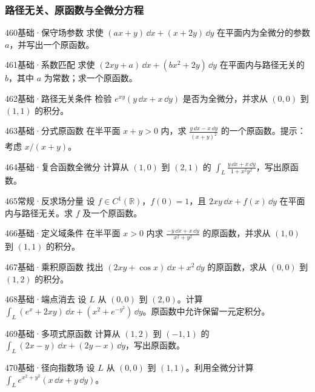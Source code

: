 \subsubsection{路径无关、原函数与全微分方程}
\begin{exercise}{460}{基础·保守场参数}
求使 $(ax+y)\,\dd x+(x+2y)\,\dd y$ 在平面内为全微分的参数 $a$，并写出一个原函数。
\end{exercise}
\begin{exercise}{461}{基础·系数匹配}
求使 $(2xy+a)\,\dd x+(bx^2+2y)\,\dd y$ 在平面内与路径无关的 $b$，其中 $a$ 为常数；求一个原函数。
\end{exercise}
\begin{exercise}{462}{基础·路径无关条件}
检验 $e^{xy}(y\,\dd x+x\,\dd y)$ 是否为全微分，并求从 $(0,0)$ 到 $(1,1)$ 的积分。
\end{exercise}
\begin{exercise}{463}{基础·分式原函数}
在半平面 $x+y>0$ 内，求 $\frac{y\,\dd x-x\,\dd y}{(x+y)^2}$ 的一个原函数。提示：考虑 $x/(x+y)$。
\end{exercise}
\begin{exercise}{464}{基础·复合函数全微分}
计算从 $(1,0)$ 到 $(2,1)$ 的 $\int_L\frac{y\,\dd x+x\,\dd y}{1+x^2y^2}$，写出原函数。
\end{exercise}
\begin{exercise}{465}{常规·反求场分量}
设 $f\in C^1(\mathbb R)$，$f(0)=1$，且 $2xy\,\dd x+f(x)\,\dd y$ 在平面内与路径无关。求 $f$ 及一个原函数。
\end{exercise}
\begin{exercise}{466}{基础·定义域条件}
在半平面 $x>0$ 内求 $\frac{-y\,\dd x+x\,\dd y}{x^2+y^2}$ 的原函数，并求从 $(1,0)$ 到 $(1,1)$ 的积分。
\end{exercise}
\begin{exercise}{467}{基础·乘积原函数}
找出 $(2xy+\cos x)\,\dd x+x^2\,\dd y$ 的原函数，求从 $(0,0)$ 到 $(1,2)$ 的积分。
\end{exercise}
\begin{exercise}{468}{基础·端点消去}
设 $L$ 从 $(0,0)$ 到 $(2,0)$。计算 $\int_L(e^x+2xy)\,\dd x+(x^2+e^{-y^2})\,\dd y$。原函数中允许保留一元定积分。
\end{exercise}
\begin{exercise}{469}{基础·多项式原函数}
计算从 $(1,2)$ 到 $(-1,1)$ 的 $\int_L(2x-y)\,\dd x+(2y-x)\,\dd y$，写出原函数。
\end{exercise}
\begin{exercise}{470}{基础·径向指数场}
设 $L$ 从 $(0,0)$ 到 $(1,1)$。利用全微分计算 $\int_Le^{x^2+y^2}(x\,\dd x+y\,\dd y)$。
\end{exercise}
